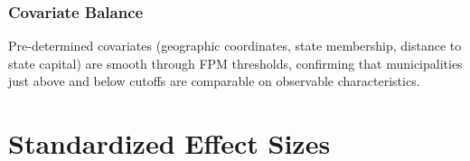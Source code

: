 \documentclass[12pt]{article}
\begin{document}
\subsubsection*{Covariate Balance} Pre-determined covariates (geographic coordinates, state membership, distance to state capital) are smooth through FPM thresholds, confirming that municipalities just above and below cutoffs are comparable on observable characteristics.

\section{Standardized Effect Sizes}
\label{sec:sde}


\end{document}
